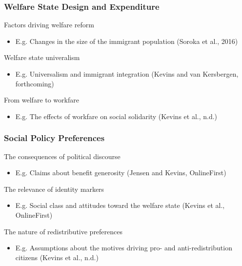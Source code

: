\documentclass[14pt]{beamer}
\begin{document}
\begin{frame}
	\frametitle{Welfare State Design and Expenditure}
	\pause
	Factors driving welfare reform
	\begin{itemize}
		\pause
		\item E.g. Changes in the size of the immigrant population (Soroka et al., 2016)
	\end{itemize}
	\pause
	Welfare state univeralism
	\begin{itemize}
		\pause
		\item E.g. Universalism and immigrant integration (Kevins and van Kersbergen, forthcoming)
	\end{itemize}
	\pause
	From welfare to workfare 
	\begin{itemize}
		\pause
		\item E.g. The effects of workfare on social solidarity (Kevins et al., n.d.)
	\end{itemize}
\end{frame}

\begin{frame}
	\pause
	\frametitle{Social Policy Preferences}
	The consequences of political discourse
	\begin{itemize}
		\pause
		\item E.g. Claims about benefit generosity (Jensen and Kevins, OnlineFirst)
	\end{itemize}
	\pause
	The relevance of identity markers 
	\begin{itemize}
		\pause
		\item E.g. Social class and attitudes toward the welfare state (Kevins et al., OnlineFirst)
	\end{itemize}
	\pause
	The nature of redistributive preferences
	\begin{itemize}
		\pause
		\item E.g. Assumptions about the motives driving pro- and anti-redistribution citizens (Kevins et al., n.d.)
	\end{itemize}
\end{frame}
\end{document}
